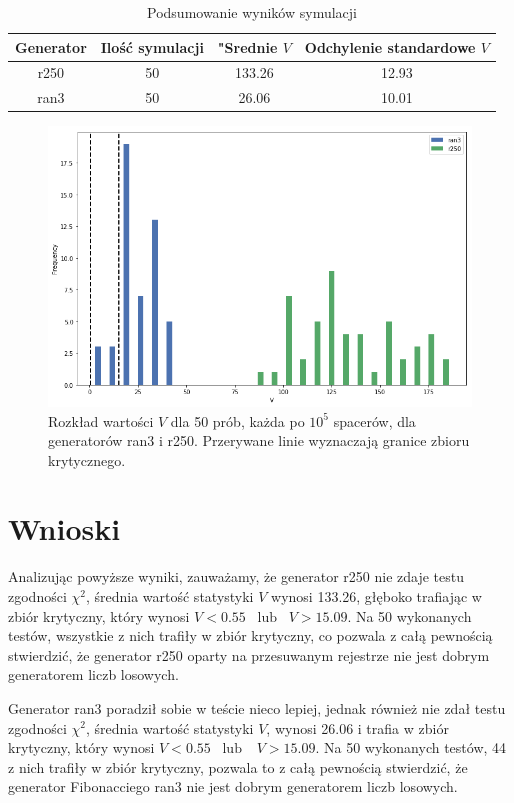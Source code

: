\documentclass[]{scrartcl}
\begin{document}
\begin{table}[h!]
	\centering
	\caption{Podsumowanie wyników symulacji}
	\begin{tabular}{|c|c| c| c|}
		\hline
		Generator & Ilość symulacji & "Srednie $V$ & Odchylenie standardowe $V$ \\ \hline
		r250  &50 &133.26 & 12.93 \\ \hline
		ran3  &50	&26.06  & 10.01\\ \hline
	\end{tabular}
\end{table}


\clearpage

\begin{figure}[h!]
	\centering
	\includegraphics[width=1\linewidth]{hists1}
	\caption{Rozkład wartości $V$ dla 50 prób, każda po $10^5$ spacerów, dla generatorów ran3 i r250. Przerywane linie wyznaczają granice zbioru krytycznego.}
\end{figure}

\section*{Wnioski}

Analizując powyższe wyniki, zauważamy, że generator r250 nie zdaje testu zgodności $\chi^2$, średnia wartość statystyki $V$ wynosi 133.26, głęboko trafiając w zbiór krytyczny, który wynosi $V < 0.55 \;\;\; \text{lub} \;\;\;  V > 15.09$. Na 50 wykonanych testów, wszystkie z nich trafiły w zbiór krytyczny, co pozwala z całą pewnością stwierdzić, że generator r250 oparty na przesuwanym rejestrze nie jest dobrym generatorem liczb losowych.


Generator ran3 poradził sobie w teście nieco lepiej, jednak również nie zdał testu zgodności $\chi^2$, średnia wartość statystyki $V$, wynosi 26.06 i trafia w zbiór krytyczny, który wynosi $V < 0.55 \;\;\; \text{lub} \;\;\;\ V > 15.09$. Na 50 wykonanych testów, 44 z nich trafiły w zbiór krytyczny, pozwala to z całą pewnością stwierdzić, że generator Fibonacciego ran3 nie jest dobrym generatorem liczb losowych.
\end{document}
